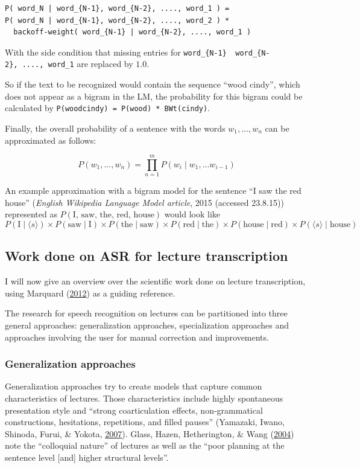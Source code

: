 \documentclass[]{article}
\begin{document}
\begin{verbatim}
P( word_N | word_{N-1}, word_{N-2}, ...., word_1 ) =
P( word_N | word_{N-1}, word_{N-2}, ...., word_2 ) *
  backoff-weight( word_{N-1} | word_{N-2}, ...., word_1 )
\end{verbatim}

With the side condition that missing entries for
\texttt{word\_\{N-1\}\ \textbar{}\ word\_\{N-2\},\ ....,\ word\_1} are
replaced by \(1.0\).

So if the text to be recognized would contain the sequence ``wood
cindy'', which does not appear as a bigram in the LM, the probability
for this bigram could be calculated by
\texttt{P(wood\textbar{}cindy)\ =\ P(wood)\ *\ BWt(cindy)}.

Finally, the overall probability of a sentence with the words
\(w_1,...,w_n\) can be approximated as follows:

\[P(w_1,...,w_n) = \prod_{n=1}^m P(w_i \mid w_1,...w_{i-1})\]

An example approximation with a bigram model for the sentence ``I saw
the red house'' (\emph{English Wikipedia Language Model article}, 2015
(accessed 23.8.15)) represented as \(P(\text{I, saw, the, red, house})\)
would look like \[
  P(\text{I} \mid \langle s \rangle) \times
  P(\text{saw} \mid \text{I}) \times
  P(\text{the} \mid \text{saw}) \times
  P(\text{red} \mid \text{the}) \times
  P(\text{house} \mid \text{red}) \times
  P(\langle s \rangle \mid \text{house})
\]

\subsection{Work done on ASR for lecture
transcription}\label{work-done-on-asr-for-lecture-transcription}

I will now give an overview over the scientific work done on lecture
transcription, using Marquard (\hyperref[ref-marquard]{2012}) as a
guiding reference.

The research for speech recognition on lectures can be partitioned into
three general approaches: generalization approaches, specialization
approaches and approaches involving the user for manual correction and
improvements.

\subsubsection{Generalization
approaches}\label{generalization-approaches}

Generalization approaches try to create models that capture common
characteristics of lectures. Those characteristics include highly
spontaneous presentation style and ``strong coarticulation effects,
non-grammatical constructions, hesitations, repetitions, and filled
pauses'' (Yamazaki, Iwano, Shinoda, Furui, \& Yokota,
\hyperref[ref-yamazaki]{2007}). Glass, Hazen, Hetherington, \& Wang
(\hyperref[ref-glass]{2004}) note the ``colloquial nature'' of lectures
as well as the ``poor planning at the sentence level {[}and{]} higher
structural levels''.
\end{document}
